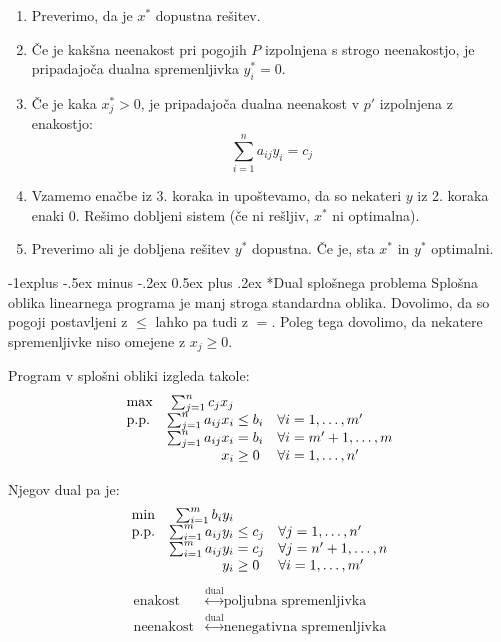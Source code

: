 \documentclass[a4paper,8pt]{extarticle}
\makeatletter
\renewcommand{\subsection}{\@startsection{subsection}{2}{0mm}%
                                {-1explus -.5ex minus -.2ex}%
                                {0.5ex plus .2ex}%
                                {\normalfont\normalsize\bfseries}}
\makeatother
\begin{document}
\begin{multicols}{4}
\begin{enumerate}
	\item Preverimo, da je $x^*$ dopustna rešitev.
	\item Če je kakšna neenakost pri pogojih $P$ izpolnjena s strogo neenakostjo, je pripadajoča dualna spremenljivka $y^*_i = 0$.
	\item Če je kaka $x^*_j > 0$, je pripadajoča dualna neenakost v $p'$ izpolnjena z enakostjo: \[\sum_{i=1}^n a_{ij} y_i = c_j \]
	\item Vzamemo enačbe iz 3. koraka in upoštevamo, da so nekateri $y$ iz 2. koraka enaki 0. Rešimo dobljeni sistem (če ni rešljiv, $x^*$ ni optimalna).
	\item Preverimo ali je dobljena rešitev $y^*$ dopustna. Če je, sta $x^*$ in $y^*$ optimalni.
\end{enumerate}

\subsection*{Dual splošnega problema}
Splošna oblika linearnega programa je manj stroga standardna oblika.
Dovolimo, da so pogoji postavljeni z $\leq$ lahko pa tudi z $=$. Poleg tega dovolimo, da nekatere spremenljivke niso omejene z $x_j \geq 0$.

Program v splošni obliki izgleda takole:
\begin{align*}
	\begin{array}{l r@{\;} l >{\scriptsize}l}
		\max 		& \sum_{j=1}^n c_j x_j	\\		
		\text{p.p.} & \sum_{j=1}^n a_{ij} x_i 	&\leq b_i	& \forall i=1,\dots , m'\\
					& \sum_{j=1}^n a_{ij} x_i 	&= b_i	& \forall i=m'+1,\dots , m\\
					& x_i 	 					&\geq 0	&\forall i=1,\dots , n'
	\end{array}
\end{align*}

Njegov dual pa je:
\begin{align*}
	\begin{array}{l r@{\;} l >{\scriptsize}l}
		\min 		& \sum_{i=1}^m b_i y_i	\\		
		\text{p.p.} & \sum_{i=1}^m a_{ij} y_i 	&\leq c_j	& \forall j=1,\dots , n'\\
					& \sum_{i=1}^m a_{ij} y_i 	&= c_j	& \forall j=n'+1,\dots , n\\
					& y_i 	 					&\geq 0	&\forall i=1,\dots , m'
	\end{array}
\end{align*}
\begin{align*}
	\text{enakost} &\overset{\text{dual}}{\longleftrightarrow} \text{poljubna spremenljivka} \\
	\text{neenakost} &\overset{\text{dual}}{\longleftrightarrow} \text{nenegativna spremenljivka} 	
\end{align*}


\end{multicols}
\end{document}
